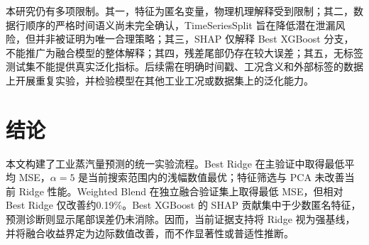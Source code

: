 \documentclass[UTF8,a4paper,twocolumn,zihao=5,fontset=none]{ctexart}
\begin{document}
本研究仍有多项限制。其一，特征为匿名变量，物理机理解释受到限制；其二，数据行顺序的严格时间语义尚未完全确认，TimeSeriesSplit 旨在降低潜在泄漏风险，但并非被证明为唯一合理策略；其三，SHAP 仅解释 Best XGBoost 分支，不能推广为融合模型的整体解释；其四，残差尾部仍存在较大误差；其五，无标签测试集不能提供真实泛化指标。后续需在明确时间戳、工况含义和外部标签的数据上开展重复实验，并检验模型在其他工业工况或数据集上的泛化能力。

\section{结论}
本文构建了工业蒸汽量预测的统一实验流程。Best Ridge 在主验证中取得最低平均 MSE，$\alpha = 5$ 是当前搜索范围内的浅幅数值最优；特征筛选与 PCA 未改善当前 Ridge 性能。Weighted Blend 在独立融合验证集上取得最低 MSE，但相对 Best Ridge 仅改善约0.19\%。Best XGBoost 的 SHAP 贡献集中于少数匿名特征，预测诊断则显示尾部误差仍未消除。因而，当前证据支持将 Ridge 视为强基线，并将融合收益界定为边际数值改善，而不作显著性或普适性推断。


\FloatBarrier
{


}
\end{document}
